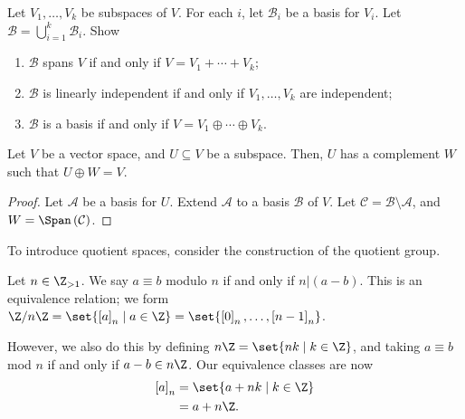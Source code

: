 \documentclass[10pt]{mypackage}
\begin{document}
\begin{exercise}
  Let $V_1,\dots,V_k$ be subspaces of $V$. For each $i$, let $\mathcal{B}_i$ be a basis for $V_i$. Let $\mathcal{B} = \bigcup_{i =1}^{k}\mathcal{B}_i$. Show
  \begin{enumerate}[(1)]
    \item $\mathcal{B}$ spans $V$ if and only if $V = V_1 + \cdots + V_k$;
    \item $\mathcal{B}$ is linearly independent if and only if $V_1,\dots,V_k$ are independent;
    \item $\mathcal{B}$ is a basis if and only if $V = V_1 \oplus \cdots \oplus V_k$.
  \end{enumerate}
\end{exercise}
\begin{lemma}
Let $V$ be a vector space, and $U\subseteq V$ be a subspace. Then, $U$ has a complement $W$ such that $U\oplus W = V$.
\end{lemma}
\begin{proof}
  Let $\mathcal{A} $ be a basis for $U$. Extend $\mathcal{A}$ to a basis $\mathcal{B}$ of $V$. Let $\mathcal{C} = \mathcal{B}\setminus \mathcal{A}$, and $W = \Span\left(\mathcal{C}\right)$.
\end{proof}
\begin{example}
To introduce quotient spaces, consider the construction of the quotient group.\newline

Let $n\in \Z_{>1}$. We say $a \equiv b$ modulo $n$ if and only if $n|(a-b)$. This is an equivalence relation; we form $\Z/n\Z = \set{\left[a\right]_n\mid a\in\Z} = \set{\left[0\right]_n,\dots,\left[n-1\right]_n}$.\newline

However, we also do this by defining $n\Z = \set{nk\mid k\in\Z}$, and taking $a\equiv b$ mod $n$ if and only if $a-b \in n\Z$. Our equivalence classes are now
\begin{align*}
  \left[a\right]_n &= \set{a + nk\mid k\in\Z}\\
                   &= a + n\Z.
\end{align*}
\end{example}
\end{document}
